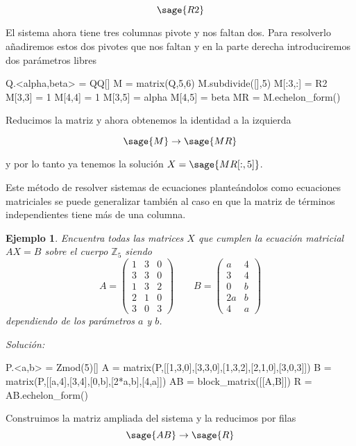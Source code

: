 \documentclass{amsart}
\newtheorem{ejem}{Ejemplo}
\begin{document}
\[ \sage{R2} \]

El sistema ahora tiene tres columnas pivote y nos faltan dos. Para resolverlo
añadiremos estos dos pivotes que nos faltan y en la parte derecha 
introduciremos dos parámetros libres

\begin{sageblock}
Q.<alpha,beta> = QQ[]
M = matrix(Q,5,6)
M.subdivide([],5)
M[:3,:] = R2
M[3,3] = 1
M[4,4] = 1
M[3,5] = alpha
M[4,5] = beta
MR = M.echelon_form()
\end{sageblock}
 
Reducimos la matriz y ahora obtenemos la identidad a la izquierda

\[ \sage{M} \to \sage{MR} \]

y por lo tanto ya tenemos la solución $X = \sage{MR[:,5]}$.


Este método de resolver sistemas de ecuaciones planteándolos como 
ecuaciones matriciales se puede generalizar también al caso en que 
la matriz de términos independientes tiene más de una columna. 

\begin{ejem}
Encuentra todas las matrices $X$ que cumplen la ecuación matricial $AX = B$
sobre el cuerpo ${\mathbb Z}_5$ siendo 
\[ A =  \left(\begin{array}{rrr}
1 & 3 & 0 \\
3 & 3 & 0 \\
1 & 3 & 2 \\
2 & 1 & 0 \\
3 & 0 & 3 \end{array}\right) \qquad 
B = \left(\begin{array}{rr}
a & 4 \\
3 & 4 \\
0 & b \\
2a & b \\
4 & a
\end{array}\right)
\]
dependiendo de los parámetros $a$ y $b$.
\end{ejem}
{\it Solución:}


\begin{sageblock}
P.<a,b> = Zmod(5)[]
A = matrix(P,[[1,3,0],[3,3,0],[1,3,2],[2,1,0],[3,0,3]])
B = matrix(P,[[a,4],[3,4],[0,b],[2*a,b],[4,a]])
AB = block_matrix([[A,B]])
R = AB.echelon_form()
\end{sageblock}

Construimos la matriz ampliada del sistema y la reducimos por filas
\[ \sage{AB} \to \sage{R} \]
\end{document}
